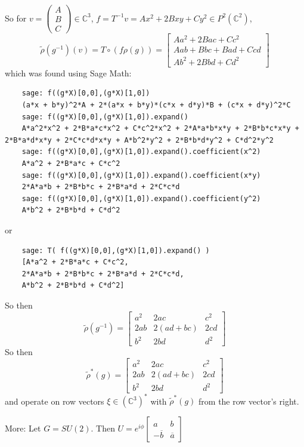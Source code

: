 \documentclass[10pt]{amsart}
\begin{document}
\begin{multicols*}{2}
\begin{enumerate}
	So for $v = \left( \begin{matrix} A \\ B \\ C \end{matrix} \right) \in \mathbb{C}^3$, $f = T^{-1}v = Ax^2 + 2Bxy + Cy^2 \in P^2(\mathbb{C}^2)$, 
	\[
	\widetilde{\rho}(g^{-1})(v) = T \circ ( f \rho(g) ) = \left[ \begin{matrix} Aa^2 + 2Bac + Cc^2 \\
	Aab + Bbc + Bad + Ccd \\
	Ab^2 + 2Bbd + Cd^2 \end{matrix} \right]
	\]
	which was found using Sage Math:
	\begin{lstlisting}
	sage: f((g*X)[0,0],(g*X)[1,0])
	(a*x + b*y)^2*A + 2*(a*x + b*y)*(c*x + d*y)*B + (c*x + d*y)^2*C
	sage: f((g*X)[0,0],(g*X)[1,0]).expand()
	A*a^2*x^2 + 2*B*a*c*x^2 + C*c^2*x^2 + 2*A*a*b*x*y + 2*B*b*c*x*y + 2*B*a*d*x*y + 2*C*c*d*x*y + A*b^2*y^2 + 2*B*b*d*y^2 + C*d^2*y^2
	sage: f((g*X)[0,0],(g*X)[1,0]).expand().coefficient(x^2)
	A*a^2 + 2*B*a*c + C*c^2
	sage: f((g*X)[0,0],(g*X)[1,0]).expand().coefficient(x*y)
	2*A*a*b + 2*B*b*c + 2*B*a*d + 2*C*c*d
	sage: f((g*X)[0,0],(g*X)[1,0]).expand().coefficient(y^2)
	A*b^2 + 2*B*b*d + C*d^2
	\end{lstlisting}
	or 
	\begin{lstlisting}
	sage: T( f((g*X)[0,0],(g*X)[1,0]).expand() )
	[A*a^2 + 2*B*a*c + C*c^2,
	2*A*a*b + 2*B*b*c + 2*B*a*d + 2*C*c*d,
	A*b^2 + 2*B*b*d + C*d^2]
	\end{lstlisting}
	
	So then 
	\[
	\widetilde{\rho}(g^{-1}) = \left[ \begin{matrix} a^2 & 2ac & c^2 \\ 2ab & 2(ad+bc) & 2cd \\ b^2 & 2bd & d^2 \end{matrix} \right]
	\]
	So then 
	\[
	\widetilde{\rho}^*(g) = \left[ \begin{matrix} a^2 & 2ac & c^2 \\ 2ab & 2(ad+bc) & 2cd \\ b^2 & 2bd & d^2 \end{matrix} \right]
	\]
	and operate on row vectors $\xi \in (\mathbb{C}^3)^*$ with $\widetilde{\rho}^*(g)$ from the row vector's right.  
\end{enumerate}

More: Let $G = SU(2)$.  Then $U = e^{i\phi} \left[ \begin{matrix} a & b \\ -\overline{b} & \overline{a} \end{matrix} \right]$


\end{multicols*}
\end{document}
